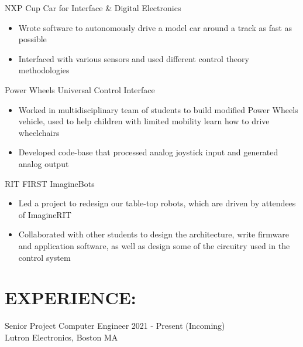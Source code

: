 \documentclass[line,margin]{res}
\newcommand{\SECTIONOFFSET}{-3.6pt}
\newcommand{\ITEMOFFSET}{-8pt}
\begin{document}
\begin{resume}

		NXP Cup Car for Interface \& Digital Electronics
		\begin{itemize}
			\item Wrote software to autonomously drive a model car around a track as fast as possible
			\item Interfaced with various sensors and used different control theory methodologies
		\end{itemize}
		\vspace{\ITEMOFFSET}

		Power Wheels Universal Control Interface
		\begin{itemize}
			\item Worked in multidisciplinary team of students to build modified Power Wheels vehicle, used to help children with limited mobility learn how to drive wheelchairs
			\item Developed code-base that processed analog joystick input and generated analog output
		\end{itemize}
		\vspace{\ITEMOFFSET}

		RIT FIRST ImagineBots
		\begin{itemize}
			\item Led a project to redesign our table-top robots, which are driven by attendees of ImagineRIT 
			\item Collaborated with other students to design the architecture, write firmware and application software, as well as design some of the circuitry used in the control system
		\end{itemize}

		\vspace{\SECTIONOFFSET}

	\section{EXPERIENCE:}

		Senior Project Computer Engineer \hfill 2021 - Present (Incoming)\\
		Lutron Electronics, Boston MA
		\vspace{\ITEMOFFSET}


\end{resume}
\end{document}
